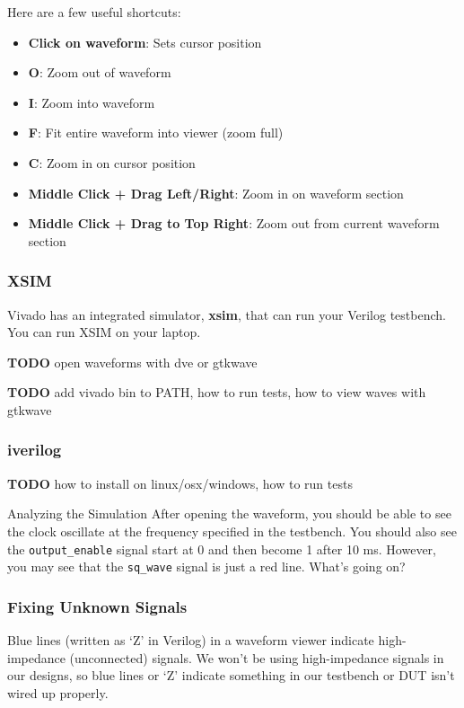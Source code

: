 \documentclass[11pt]{article}
\makeatletter
\renewcommand{\subsection}
{\@startsection {subsection}{1}{0pt}
 {-1ex}
 {0.5ex}
 {\bfseries\normalsize}}
\makeatother
\begin{document}
Here are a few useful shortcuts:

\begin{itemize}
	\item \textbf{Click on waveform}: Sets cursor position
	\item \textbf{O}: Zoom out of waveform
	\item \textbf{I}: Zoom into waveform
	\item \textbf{F}: Fit entire waveform into viewer (zoom full)
	\item \textbf{C}: Zoom in on cursor position
	\item \textbf{Middle Click + Drag Left/Right}: Zoom in on waveform section
	\item \textbf{Middle Click + Drag to Top Right}: Zoom out from current waveform section
\end{itemize}

\subsubsection{XSIM}
Vivado has an integrated simulator, \textbf{xsim}, that can run your Verilog testbench.
You can run XSIM on your laptop.

\textbf{TODO} open waveforms with dve or gtkwave

\textbf{TODO} add vivado bin to PATH, how to run tests, how to view waves with gtkwave

\subsubsection{iverilog}
\textbf{TODO} how to install on linux/osx/windows, how to run tests

\subsection{Analyzing the Simulation}
After opening the waveform, you should be able to see the clock oscillate at the frequency specified in the testbench.
You should also see the \verb|output_enable| signal start at 0 and then become 1 after 10 ms.
However, you may see that the \verb|sq_wave| signal is just a red line. What's going on?

\subsubsection{Fixing Unknown Signals}
Blue lines (written as `Z' in Verilog) in a waveform viewer indicate high-impedance (unconnected) signals.
We won't be using high-impedance signals in our designs, so blue lines or `Z' indicate something in our testbench or DUT isn't wired up properly.
\end{document}
